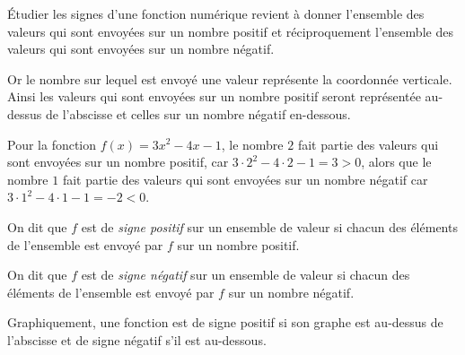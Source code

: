 \'Etudier les signes d'une fonction numérique revient à donner l'ensemble des valeurs qui sont envoyées sur un nombre positif et réciproquement l'ensemble des valeurs qui sont envoyées sur un nombre négatif.

Or le nombre sur lequel est envoyé une valeur représente la coordonnée verticale. Ainsi les valeurs qui sont envoyées sur un nombre positif seront représentée au-dessus de l'abscisse et celles sur un nombre négatif en-dessous.

\begin{exemple}
Pour la fonction $f(x) = 3x^2 -4x -1$, le nombre $2$ fait partie des valeurs qui sont envoyées sur un nombre positif, car $3\cdot 2^2 - 4\cdot 2 - 1 = 3 >0$, alors que le nombre $1$ fait partie des valeurs qui sont envoyées sur un nombre négatif car $3\cdot 1^2 - 4 \cdot 1 -1 = -2 <0$.
\end{exemple}

\begin{definition}
On dit que $f$ est de \emph{signe positif} sur un ensemble de valeur si chacun des éléments de l'ensemble est envoyé par $f$ sur un nombre positif.

On dit que $f$ est de \emph{signe négatif} sur un ensemble de valeur si chacun des éléments de l'ensemble est envoyé par $f$ sur un nombre négatif.
\end{definition}

Graphiquement, une fonction est de signe positif si son graphe est au-dessus de l'abscisse et de signe négatif s'il est au-dessous.

